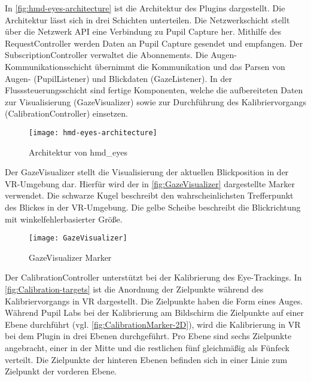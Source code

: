 In \autoref{fig:hmd-eyes-architecture} ist die Architektur des Plugins dargestellt. Die Architektur lässt sich in drei Schichten unterteilen. Die Netzwerkschicht stellt über  die Netzwerk API eine Verbindung zu Pupil Capture her. Mithilfe des {\ttfamily RequestController} werden Daten an Pupil Capture gesendet und empfangen. Der {\ttfamily SubscriptionController} verwaltet die Abonnements. Die Augen-Kommunikationsschicht übernimmt die Kommunikation und das Parsen von Augen- ({\ttfamily PupilListener}) und Blickdaten ({\ttfamily GazeListener}). In der Flusssteuerungsschicht sind fertige Komponenten, welche die aufbereiteten Daten zur Visualisierung ({\ttfamily GazeVisualizer}) sowie zur Durchführung des Kalibriervorgangs ({\ttfamily CalibrationController}) einsetzen. \cite{hmd-eyes-doc.2020} 

\begin{figure}[!htbp]
	\centering
	\texttt{[image: hmd-eyes-architecture]}
	\caption[Architektur von hmd\_eyes]{Architektur von hmd\_eyes \cite{hmd-eyes-architecture.2020}}
	\label{fig:hmd-eyes-architecture}
\end{figure}

Der {\ttfamily GazeVisualizer} stellt die Visualisierung der aktuellen Blickposition in der \ac{VR}-Umgebung dar. Hierfür wird der in \autoref{fig:GazeVisualizer} dargestellte Marker verwendet. Die schwarze Kugel beschreibt den wahrscheinlichsten Trefferpunkt des Blickes in der \ac{VR}-Umgebung. Die gelbe Scheibe beschreibt die Blickrichtung mit winkelfehlerbasierter Größe. \cite{hmd-eyes-doc.2020}

\begin{figure}[!htbp]
	\centering
	\texttt{[image: GazeVisualizer]}
	\caption[GazeVisualizer Marker]{GazeVisualizer Marker}
	\label{fig:GazeVisualizer}
\end{figure}

Der {\ttfamily CalibrationController} unterstützt bei der Kalibrierung des Eye-Trackings. In \autoref{fig:Calibration-targets} ist die Anordnung der Zielpunkte während des Kalibriervorgangs in \ac{VR} dargestellt. Die Zielpunkte haben die Form eines Auges. Während Pupil Labs bei der Kalibrierung am Bildschirm die Zielpunkte auf einer Ebene durchführt (vgl. \autoref{fig:CalibrationMarker-2D}), wird die Kalibrierung in \ac{VR} bei dem Plugin in drei Ebenen durchgeführt. Pro Ebene sind sechs Zielpunkte angebracht, einer in der Mitte und die restlichen fünf gleichmäßig als Fünfeck verteilt. Die Zielpunkte der hinteren Ebenen befinden sich in einer Linie zum Zielpunkt der vorderen Ebene.

